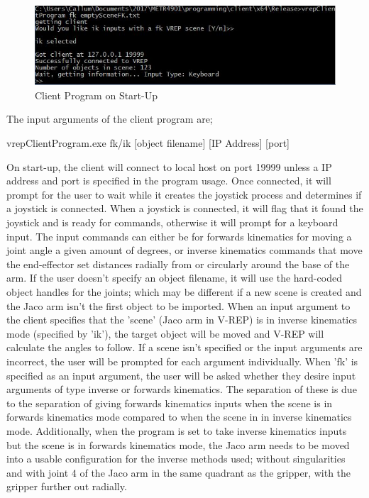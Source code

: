 \documentclass[12pt,openany,a4paper]{book}
\begin{document}
\begin{center}
\begin{figure}[htb]
  \includegraphics[width=\linewidth]{client_start_up.jpg}
\caption{ Client Program on Start-Up }
\end{figure}
\end{center}
The input arguments of the client program are;

vrepClientProgram.exe fk/ik [object filename] [IP Address] [port]

On start-up, the client will connect to local host on port 19999 unless a IP address and port is specified in the program usage. Once connected, it will prompt for the user to wait while it creates the joystick process and determines if a joystick is connected. When a joystick is connected, it will flag that it found the joystick and is ready for commands, otherwise it will prompt for a keyboard input. The input commands can either be for forwards kinematics for moving a joint angle a given amount of degrees, or inverse kinematics commands that move the end-effector set distances radially from or circularly around the base of the arm. If the user doesn't specify an object filename, it will use the hard-coded object handles for the joints; which may be different if a new scene is created and the Jaco arm isn't the first object to be imported. 
When an input argument to the client specifies that the 'scene' (Jaco arm in V-REP) is in inverse kinematics mode (specified by 'ik'), the target object will be moved and V-REP will calculate the angles to follow. If a scene isn't specified or the input arguments are incorrect, the user will be prompted for each argument individually. When 'fk' is specified as an input argument, the user will be asked whether they desire input arguments of type inverse or forwards kinematics. The separation of these is due to the separation of giving forwards kinematics inputs when the scene is in forwards kinematics mode compared to when the scene in in inverse kinematics mode. Additionally, when the program is set to take inverse kinematics inputs but the scene is in forwards kinematics mode, the Jaco arm needs to be moved into a usable configuration for the inverse methods used; without singularities and with joint 4 of the Jaco arm in the same quadrant as the gripper, with the gripper further out radially.
\end{document}
